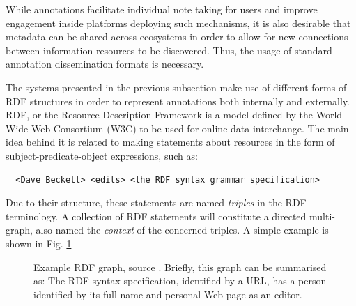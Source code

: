 
While annotations facilitate individual note taking for users and improve
engagement inside platforms deploying such mechanisms, it is also desirable
that metadata can be shared across ecosystems in order to allow for new
connections between information resources to be discovered. Thus, the usage of
standard annotation dissemination formats is necessary.

The systems presented in the previous subsection make use of different forms of
RDF structures in order to represent annotations both internally and
externally.  RDF, or the Resource Description Framework \cite{ref:rdf} is a
model defined by the World Wide Web Consortium (W3C) to be used for online data
interchange. The main idea behind it is related to making statements about
resources in the form of subject-predicate-object expressions, such as:

\begin{verbatim}
  <Dave Beckett> <edits> <the RDF syntax grammar specification>
\end{verbatim}

Due to their structure, these statements are named \textit{triples} in the RDF
terminology.  A collection of RDF statements will constitute a directed
multi-graph, also named the \textit{context} of the concerned triples. A simple
example is shown in Fig. \ref{fig:rdf}

\begin{figure}[!h]
  \centering
  \caption[Example RDF graph]
          {Example RDF graph, source \cite{ref:rdfsyntax}. Briefly, this graph
           can be summarised as: The RDF syntax specification, identified by a
           URL, has a person identified by its full name and personal Web page
           as an editor.}
  \label{fig:rdf}
\end{figure}

